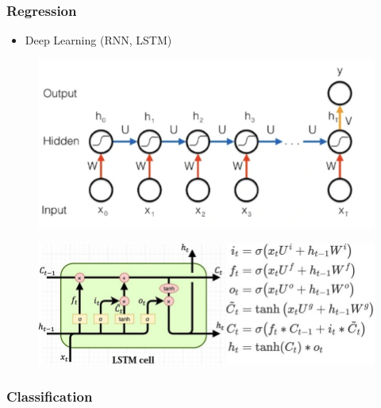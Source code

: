 \begin{frame}\frametitle{Regression}
   \begin{itemize}
      \item Deep Learning (RNN, LSTM)
   \end{itemize}
   \begin{figure}[H]
      \includegraphics[scale=.35]{../images/illustrations/model_rnn.png}
   \end{figure}
   \begin{figure}[H]
      \includegraphics[scale=.35]{../images/illustrations/model_lstm.png}
   \end{figure}
\end{frame}


\subsubsection{Classification}

